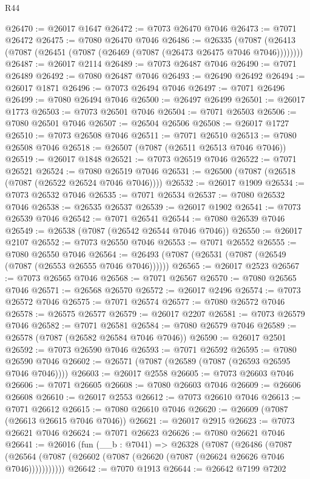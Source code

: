 \begin{lexlean}{R44}
\begin{coremodule}
{@26470 := @26017 @1647
@26472 := @7073 @26470 @7046
@26473 := @7071 @26472
@26475 := @7080 @26470 @7046
@26486 := @26335
    (@7087 (@26413 (@7087 (@26451 (@7087 (@26469 (@7087 (@26473 @26475 @7046 @7046))))))))
@26487 := @26017 @2114
@26489 := @7073 @26487 @7046
@26490 := @7071 @26489
@26492 := @7080 @26487 @7046
@26493 := @26490 @26492
@26494 := @26017 @1871
@26496 := @7073 @26494 @7046
@26497 := @7071 @26496
@26499 := @7080 @26494 @7046
@26500 := @26497 @26499
@26501 := @26017 @1773
@26503 := @7073 @26501 @7046
@26504 := @7071 @26503
@26506 := @7080 @26501 @7046
@26507 := @26504 @26506
@26508 := @26017 @1727
@26510 := @7073 @26508 @7046
@26511 := @7071 @26510
@26513 := @7080 @26508 @7046
@26518 := @26507 (@7087 (@26511 @26513 @7046 @7046))
@26519 := @26017 @1848
@26521 := @7073 @26519 @7046
@26522 := @7071 @26521
@26524 := @7080 @26519 @7046
@26531 := @26500 (@7087 (@26518 (@7087 (@26522 @26524 @7046 @7046))))
@26532 := @26017 @1909
@26534 := @7073 @26532 @7046
@26535 := @7071 @26534
@26537 := @7080 @26532 @7046
@26538 := @26535 @26537
@26539 := @26017 @1902
@26541 := @7073 @26539 @7046
@26542 := @7071 @26541
@26544 := @7080 @26539 @7046
@26549 := @26538 (@7087 (@26542 @26544 @7046 @7046))
@26550 := @26017 @2107
@26552 := @7073 @26550 @7046
@26553 := @7071 @26552
@26555 := @7080 @26550 @7046
@26564 := @26493 (@7087 (@26531 (@7087 (@26549 (@7087 (@26553 @26555 @7046 @7046))))))
@26565 := @26017 @2523
@26567 := @7073 @26565 @7046
@26568 := @7071 @26567
@26570 := @7080 @26565 @7046
@26571 := @26568 @26570
@26572 := @26017 @2496
@26574 := @7073 @26572 @7046
@26575 := @7071 @26574
@26577 := @7080 @26572 @7046
@26578 := @26575 @26577
@26579 := @26017 @2207
@26581 := @7073 @26579 @7046
@26582 := @7071 @26581
@26584 := @7080 @26579 @7046
@26589 := @26578 (@7087 (@26582 @26584 @7046 @7046))
@26590 := @26017 @2501
@26592 := @7073 @26590 @7046
@26593 := @7071 @26592
@26595 := @7080 @26590 @7046
@26602 := @26571 (@7087 (@26589 (@7087 (@26593 @26595 @7046 @7046))))
@26603 := @26017 @2558
@26605 := @7073 @26603 @7046
@26606 := @7071 @26605
@26608 := @7080 @26603 @7046
@26609 := @26606 @26608
@26610 := @26017 @2553
@26612 := @7073 @26610 @7046
@26613 := @7071 @26612
@26615 := @7080 @26610 @7046
@26620 := @26609 (@7087 (@26613 @26615 @7046 @7046))
@26621 := @26017 @2915
@26623 := @7073 @26621 @7046
@26624 := @7071 @26623
@26626 := @7080 @26621 @7046
@26641 := @26016
    (fun (__b : @7041) =>
    @26328
      (@7087
        (@26486
          (@7087 (@26564 (@7087 (@26602 (@7087 (@26620 (@7087 (@26624 @26626 @7046 @7046)))))))))))
@26642 := @7070 @1913
@26644 := @26642 @7199 @7202
}
\end{coremodule}
\end{lexlean}
